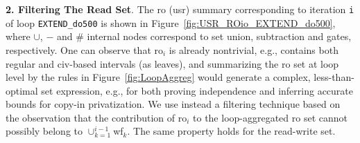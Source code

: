 \documentclass{sig-alternate}
\begin{document}
\vspace{1ex}

{\bf 2. Filtering The Read Set}. The {\sc ro} ({\sc usr}) summary corresponding 
to iteration {\tt i} of loop {\tt EXTEND\_do500} is shown in 
Figure~\ref{fig:USR_ROio_EXTEND_do500}, where $\cup$, $-$ and $\#$ internal nodes 
correspond to set union, subtraction and gates, respectively.   
One can observe that {\sc ro}$_{i}$ is already nontrivial, e.g.,
contains both regular and {\sc civ}-based intervals (as leaves), and summarizing the 
{\sc ro} set at loop level by the rules in Figure~\ref{fig:LoopAggreg} would 
generate a complex, less-than-optimal set expression, e.g., for both proving 
independence and inferring accurate bounds for copy-in privatization.
%
We use instead a filtering technique based on the observation that
the contribution of {\sc ro}$_i$ to the loop-aggregated
{\sc ro} set cannot possibly belong to $\cup_{k=1}^{i-1}${\sc wf}$_k$.
The same property holds for the read-write set.
\end{document}
